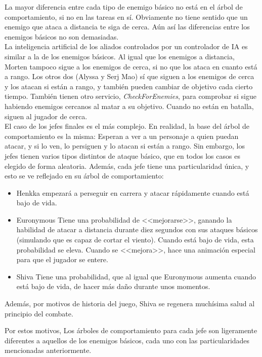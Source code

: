 La mayor diferencia entre cada tipo de enemigo básico no está en el árbol de comportamiento, si no en las tareas en sí. Obviamente no tiene sentido que un enemigo que ataca a distancia te siga de cerca. Aún así las diferencias entre los enemigos básicos no son demasiadas.
\\

La inteligencia artificial de los aliados controlados por un controlador de {IA} es similar a la de los enemigos básicos. Al igual que los enemigos a distancia, Morten tampoco sigue a los enemigos de cerca, si no que los ataca en cuanto está a rango. Los otros dos (Alyssa y Serj Mao) sí que siguen a los enemigos de cerca y los atacan si están a rango, y también pueden cambiar de objetivo cada cierto tiempo. También tienen otro servicio, \textit{CheckForEnemies}, para comprobar si sigue habiendo enemigos cercanos al matar a su objetivo. Cuando no están en batalla, siguen al jugador de cerca.
\\

El caso de los jefes finales es el más complejo. En realidad, la base del árbol de comportamiento es la misma: Esperan a ver a un personaje a quien puedan atacar, y si lo ven, lo persiguen y lo atacan si están a rango. Sin embargo, los jefes tienen varios tipos distintos de ataque básico, que en todos los casos es elegido de forma aleatoria. Además, cada jefe tiene una particularidad única, y esto se ve reflejado en su árbol de comportamiento:

\begin{itemize}
\item Henkka empezará a perseguir en carrera y atacar rápidamente cuando está bajo de vida.
\item Euronymous Tiene una probabilidad de <<mejorarse>>, ganando la habilidad de atacar a distancia durante diez segundos con sus ataques básicos (simulando que es capaz de cortar el viento). Cuando está bajo de vida, esta probabilidad se eleva. Cuando se <<mejora>>, hace una animación especial para que el jugador se entere.
\item Shiva Tiene una probabilidad, que al igual que Euronymous aumenta cuando está bajo de vida, de hacer más daño durante unos momentos.
\end{itemize}

Además, por motivos de historia del juego, Shiva se regenera muchísima salud al principio del combate.


Por estos motivos, Los árboles de comportamiento para cada jefe son ligeramente diferentes a aquellos de los enemigos básicos, cada uno con las particularidades mencionadas anteriormente.


